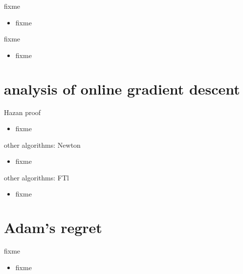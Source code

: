\documentclass[xcolor={svgnames},
               hyperref={colorlinks,citecolor=DeepPink4,linkcolor=FireBrick,urlcolor=Maroon}]
               {beamer}
\begin{document}
\begin{frame}{fixme}

\begin{itemize}
\item fixme
\end{itemize}
\end{frame}

\begin{frame}{fixme}

\begin{itemize}
\item fixme
\end{itemize}
\end{frame}


\section{analysis of online gradient descent}

\begin{frame}{Hazan proof}

\begin{itemize}
\item fixme
\end{itemize}
\end{frame}

\begin{frame}{other algorithms: Newton}

\begin{itemize}
\item fixme
\end{itemize}
\end{frame}

\begin{frame}{other algorithms: FTl}

\begin{itemize}
\item fixme
\end{itemize}
\end{frame}


\section{Adam's regret}

\begin{frame}{fixme}

\begin{itemize}
\item fixme
\end{itemize}
\end{frame}
\end{document}
